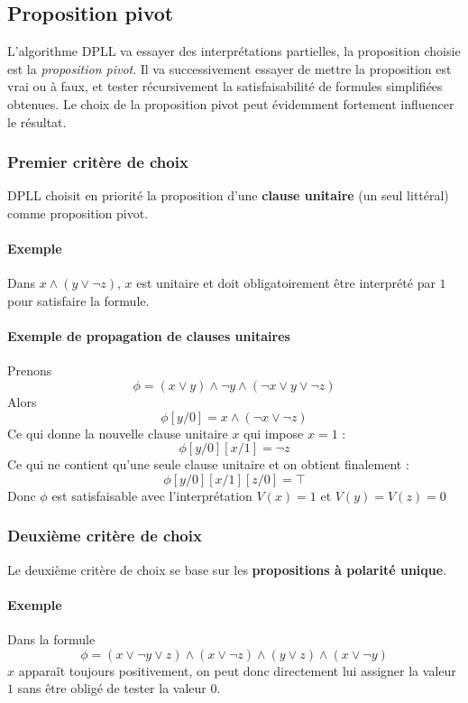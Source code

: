 \documentclass[a4paper]{article}
\begin{document}
  \subsection{Proposition pivot}
  L'algorithme DPLL va essayer des interprétations partielles, la 
proposition choisie
  est la \textit{proposition pivot}. Il va successivement essayer de 
mettre la 
  proposition est vrai ou à faux, et tester récursivement la 
satisfaisabilité de formules
  simplifiées obtenues. Le choix de la proposition pivot peut évidemment 
fortement
  influencer le résultat.

  \subsubsection{Premier critère de choix}
  DPLL choisit en priorité la proposition d'une \textbf{clause unitaire} 
(un seul littéral)
  comme proposition pivot. 

  \paragraph{Exemple} Dans $x \land (y \lor \lnot z)$, $x$ est unitaire 
et doit 
  obligatoirement être interprété par $1$ pour satisfaire la formule.

  \paragraph{Exemple de propagation de clauses unitaires}
  Prenons $$\phi = (x\lor y) \land \lnot y \land (\lnot x \lor y \lor 
\lnot z)$$
  Alors $$ \phi[y/0] = x \land (\lnot x \lor \lnot z) $$
  Ce qui donne la nouvelle clause unitaire $x$ qui impose $ x = 1 $ :
  $$ \phi[y/0][x/1] =  \lnot z$$ 
  Ce qui ne contient qu'une seule clause unitaire et on obtient 
finalement :
  $$ \phi[y/0][x/1][z/0] = \top $$
  Donc $\phi$ est satisfaisable avec l'interprétation $V(x) = 1$ et 
$V(y) = V(z) = 0$

  \subsubsection{Deuxième critère de choix}
  Le deuxième critère de choix se base sur les \textbf{propositions à 
polarité unique}.

  \paragraph{Exemple} Dans la formule 
  $$\phi = (x \lor \lnot y \lor z) \land (x \lor \lnot z) \land (y \lor 
z) \land (x \lor \lnot y) $$
  $x$ apparaît toujours positivement, on peut donc directement lui 
assigner la valeur $1$
  sans être obligé de tester la valeur $0$.
\end{document}
